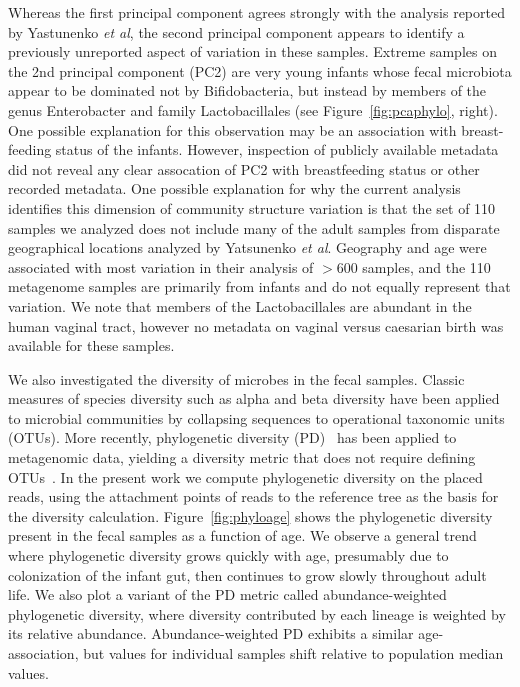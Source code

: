 \documentclass[10pt]{article}
\begin{document}
Whereas the first principal component agrees strongly with the analysis reported by Yastunenko \textit{et al}, the second principal component appears to identify a previously unreported aspect of variation in these samples.
Extreme samples on the 2nd principal component (PC2) are very young infants whose fecal microbiota appear to be dominated not by Bifidobacteria, but instead by members of the genus Enterobacter and family Lactobacillales (see Figure~\ref{fig:pcaphylo}, right).
One possible explanation for this observation may be an association with breast-feeding status of the infants.
However, inspection of publicly available metadata did not reveal any clear assocation of PC2 with breastfeeding status or other recorded metadata.
One possible explanation for why the current analysis identifies this dimension of community structure variation is that the set of 110 samples we analyzed does not include many of the adult samples from disparate geographical locations analyzed by Yatsunenko \textit{et al}.
Geography and age were associated with most variation in their analysis of $>$600 samples, and the 110 metagenome samples are primarily from infants and do not equally represent that variation.
We note that members of the Lactobacillales are abundant in the human vaginal tract, however no metadata on vaginal versus caesarian birth was available for these samples.

We also investigated the diversity of microbes in the fecal samples.
Classic measures of species diversity such as alpha and beta diversity have been applied to microbial communities by collapsing sequences to operational taxonomic units (OTUs).
More recently, phylogenetic diversity (PD)~\cite{Faith1992} has been applied to metagenomic data, yielding a diversity metric that does not require defining OTUs~\cite{Kembel2011}.
In the present work we compute phylogenetic diversity on the placed reads, using the attachment points of reads to the reference tree as the basis for the diversity calculation.
Figure~\ref{fig:phyloage} shows the phylogenetic diversity present in the fecal samples as a function of age.
We observe a general trend where phylogenetic diversity grows quickly with age, presumably due to colonization of the infant gut, then continues to grow slowly throughout adult life.
We also plot a variant of the PD metric called abundance-weighted phylogenetic diversity, where diversity contributed by each lineage is weighted by its relative abundance.
Abundance-weighted PD exhibits a similar age-association, but values for individual samples shift relative to population median values.
\end{document}
